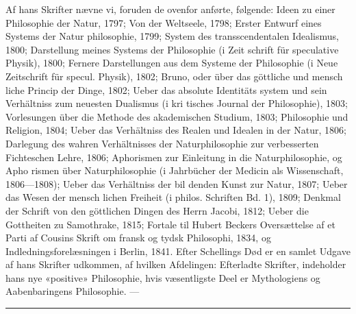 \documentclass[12pt,a4paper]{book}
\newcommand{\divrule}{\begin{center}\rule{2cm}{0.4pt}\end{center}}
\begin{document}
Af hans Skrifter nævne vi, foruden de ovenfor anførte,
følgende: Ideen zu einer Philosophie der Natur, 1797; Von
der Weltseele, 1798; Erster Entwurf eines Systems der Natur\-%
philosophie, 1799; System des transscendentalen Idealismus,
1800; Darstellung meines Systems der Philosophie (i Zeit\-%
schrift für speculative Physik), 1800; Fernere Darstellungen
aus dem Systeme der Philosophie (i Neue Zeitschrift für specul.
Physik), 1802; Bruno, oder über das göttliche und mensch\-%
liche Princip der Dinge, 1802; Ueber das absolute Identitäts\-%
system und sein Verhältniss zum neuesten Dualismus (i kri\-%
tisches Journal der Philosophie), 1803; Vorlesungen über die
Methode des akademischen Studium, 1803; Philosophie und
Religion, 1804; Ueber das Verhältniss des Realen und Idealen
in der Natur, 1806; Darlegung des wahren Verhältnisses der
Naturphilosophie zur verbesserten Fichteschen Lehre, 1806;
Aphorismen zur Einleitung in die Naturphilosophie, og Apho\-%
rismen über Naturphilosophie (i Jahrbücher der Medicin als
Wissenschaft, 1806---1808); Ueber das Verhältniss der bil\-%
denden Kunst zur Natur, 1807; Ueber das Wesen der mensch\-%
lichen Freiheit (i philos. Schriften Bd. 1), 1809; Denkmal der
Schrift von den göttlichen Dingen des Herrn Jacobi, 1812;
Ueber die Gottheiten zu Samothrake, 1815; Fortale til Hubert
Beckers Oversættelse af et Parti af Cousins Skrift om fransk
og tydsk Philosophi, 1834, og Indledningsforelæsningen i Berlin,
1841. Efter Schellings Død er en samlet Udgave af hans
Skrifter udkommen, af hvilken Afdelingen: Efterladte Skrifter,
indeholder hans nye «positive» Philosophie, hvis væsentligste
Deel er Mythologiens og Aabenbaringens Philosophie. ---

\divrule
\end{document}
